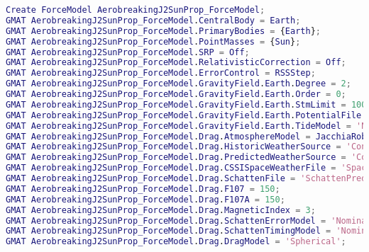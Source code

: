 \begin{lstlisting}[language=MATLAB, caption= Scrit de GMAT]
Create ForceModel AerobreakingJ2SunProp_ForceModel;
GMAT AerobreakingJ2SunProp_ForceModel.CentralBody = Earth;
GMAT AerobreakingJ2SunProp_ForceModel.PrimaryBodies = {Earth};
GMAT AerobreakingJ2SunProp_ForceModel.PointMasses = {Sun};
GMAT AerobreakingJ2SunProp_ForceModel.SRP = Off;
GMAT AerobreakingJ2SunProp_ForceModel.RelativisticCorrection = Off;
GMAT AerobreakingJ2SunProp_ForceModel.ErrorControl = RSSStep;
GMAT AerobreakingJ2SunProp_ForceModel.GravityField.Earth.Degree = 2;
GMAT AerobreakingJ2SunProp_ForceModel.GravityField.Earth.Order = 0;
GMAT AerobreakingJ2SunProp_ForceModel.GravityField.Earth.StmLimit = 100;
GMAT AerobreakingJ2SunProp_ForceModel.GravityField.Earth.PotentialFile = 'JGM2.cof';
GMAT AerobreakingJ2SunProp_ForceModel.GravityField.Earth.TideModel = 'None';
GMAT AerobreakingJ2SunProp_ForceModel.Drag.AtmosphereModel = JacchiaRoberts;
GMAT AerobreakingJ2SunProp_ForceModel.Drag.HistoricWeatherSource = 'ConstantFluxAndGeoMag';
GMAT AerobreakingJ2SunProp_ForceModel.Drag.PredictedWeatherSource = 'ConstantFluxAndGeoMag';
GMAT AerobreakingJ2SunProp_ForceModel.Drag.CSSISpaceWeatherFile = 'SpaceWeather-All-v1.2.txt';
GMAT AerobreakingJ2SunProp_ForceModel.Drag.SchattenFile = 'SchattenPredict.txt';
GMAT AerobreakingJ2SunProp_ForceModel.Drag.F107 = 150;
GMAT AerobreakingJ2SunProp_ForceModel.Drag.F107A = 150;
GMAT AerobreakingJ2SunProp_ForceModel.Drag.MagneticIndex = 3;
GMAT AerobreakingJ2SunProp_ForceModel.Drag.SchattenErrorModel = 'Nominal';
GMAT AerobreakingJ2SunProp_ForceModel.Drag.SchattenTimingModel = 'NominalCycle';
GMAT AerobreakingJ2SunProp_ForceModel.Drag.DragModel = 'Spherical';


\end{lstlisting}
